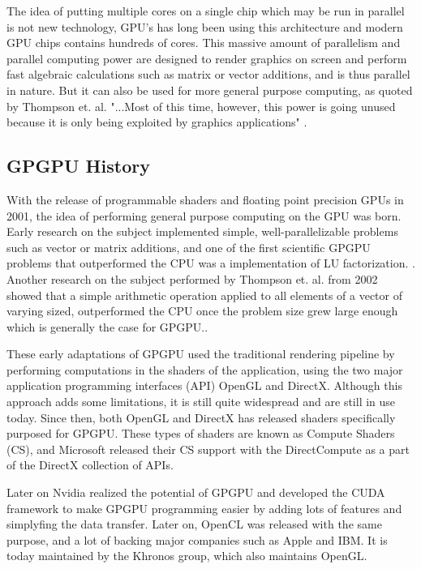 The idea of putting multiple cores on a single chip which may be run in parallel is not new technology, GPU's has long been using this architecture and modern GPU chips contains hundreds of cores. This massive amount of parallelism and parallel computing power are designed to render graphics on screen and perform fast algebraic calculations such as matrix or vector additions, and is thus parallel in nature. But it can also be used for more general purpose computing, as quoted by Thompson et. al. "...Most of this time, however, this power is going unused because it is only
being exploited by graphics applications" \cite{thompson2002gpgpu}.


\subsection{GPGPU History}
With the release of programmable shaders and floating point precision GPUs in 2001, the idea of performing general purpose computing on the GPU was born. Early research on the subject implemented simple, well-parallelizable problems such as vector or matrix additions, and one of the first scientific GPGPU problems that outperformed the CPU was a implementation of LU factorization. \cite{CUDAtoOpenCL}. Another research on the subject performed by Thompson et. al. from 2002 showed that a simple arithmetic operation applied to all elements of a vector of varying sized, outperformed the CPU once the problem size grew large enough which is generally the case for GPGPU.\cite{thompson2002gpgpu}.

These early adaptations of GPGPU used the traditional rendering pipeline by performing computations in the shaders of the application, using the two major application programming interfaces (API) OpenGL and DirectX. Although this approach adds some limitations, it is still quite widespread and are still in use today. Since then, both OpenGL and DirectX has released shaders specifically purposed for GPGPU. These types of shaders are known as Compute Shaders (CS), and Microsoft released their CS support with the DirectCompute as a part of the DirectX collection of APIs.

Later on Nvidia realized the potential of GPGPU and developed the CUDA framework to make GPGPU programming easier by adding lots of features and simplyfing the data transfer. Later on, OpenCL was released with the same purpose, and a lot of backing major companies such as Apple and IBM. It is today maintained by the Khronos group, which also maintains OpenGL.

